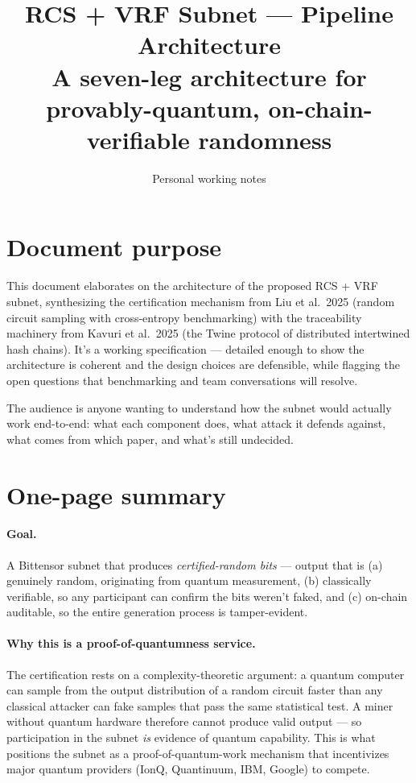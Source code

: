 \documentclass[11pt]{article}
\title{RCS + VRF Subnet --- Pipeline Architecture \\
\large A seven-leg architecture for provably-quantum, on-chain-verifiable randomness}
\author{Personal working notes}
\date{}
\begin{document}
\maketitle

\section{Document purpose}

This document elaborates on the architecture of the proposed RCS + VRF subnet, synthesizing the certification mechanism from Liu et al.\ 2025 (random circuit sampling with cross-entropy benchmarking) with the traceability machinery from Kavuri et al.\ 2025 (the Twine protocol of distributed intertwined hash chains). It's a working specification --- detailed enough to show the architecture is coherent and the design choices are defensible, while flagging the open questions that benchmarking and team conversations will resolve.

The audience is anyone wanting to understand how the subnet would actually work end-to-end: what each component does, what attack it defends against, what comes from which paper, and what's still undecided.

\section{One-page summary}

\paragraph{Goal.} A Bittensor subnet that produces \emph{certified-random bits} --- output that is (a) genuinely random, originating from quantum measurement, (b) classically verifiable, so any participant can confirm the bits weren't faked, and (c) on-chain auditable, so the entire generation process is tamper-evident.

\paragraph{Why this is a proof-of-quantumness service.} The certification rests on a complexity-theoretic argument: a quantum computer can sample from the output distribution of a random circuit faster than any classical attacker can fake samples that pass the same statistical test. A miner without quantum hardware therefore cannot produce valid output --- so participation in the subnet \emph{is} evidence of quantum capability. This is what positions the subnet as a proof-of-quantum-work mechanism that incentivizes major quantum providers (IonQ, Quantinuum, IBM, Google) to compete.
\end{document}
